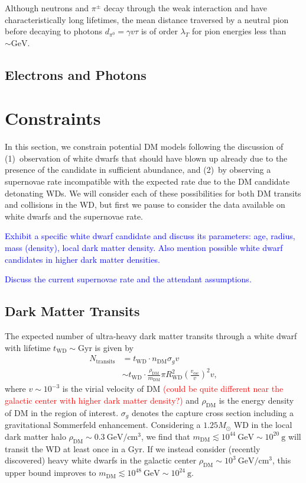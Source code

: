 \documentclass[twocolumn,showpacs,preprintnumbers,amsmath,amssymb,prd]{revtex4}
\newcommand{\GeV}{\text{GeV}}
\def\r{\right)}
\def\l{\left(}
\begin{document}
Although neutrons and $\pi^\pm$ decay through the weak interaction and have characteristically long lifetimes, the mean distance traversed by a neutral pion before decaying to photons $d_{\pi^0} = \gamma v \tau$ is of order $\lambda_T$ for pion energies less than $\sim \text{GeV}$. 
\subsection{Electrons and Photons}

\section{Constraints}
\label{sec:Constraints}

In this section, we constrain potential DM models following the discussion of \cite{Graham:2015apa} (1)~observation of white dwarfs that should have blown up already due to the presence of the candidate in sufficient abundance, and (2)~by observing a supernovae rate incompatible with the expected rate due to the DM candidate detonating WDs. We will consider each of these possibilities for both DM transits and collisions in the WD, but first we pause to consider the data available on white dwarfs and the supernovae rate.

\textcolor{blue}{Exhibit a specific white dwarf candidate and discuss its parameters: age, radius, mass (density), local dark matter density. Also mention possible white dwarf candidates in higher dark matter densities.}

\textcolor{blue}{Discuss the current supernovae rate and the attendant assumptions.}

\subsection{Dark Matter Transits}
\label{sec:TransitConstraints}

The expected number of ultra-heavy dark matter transits through a white dwarf with lifetime $t_\text{WD} \sim \text{Gyr}$ is given by
\begin{align}
N_\text{transits}  &= t_\text{WD} \cdot n_\text{DM} \sigma_g v \\
 &  \sim t_\text{WD} \cdot \frac{\rho_{\text{DM}}}{m_\text{DM}} \pi R_\text{WD}^2 \l\frac{v_\text{esc}}{v}\r^2 v,
\end{align}
where $v \sim 10^{-3}$ is the virial velocity of DM \textcolor{red}{(could be quite different near the galactic center with higher dark matter density?)} and $\rho_{\text{DM}}$ is the energy density of DM in the region of interest. $\sigma_g$ denotes the capture cross section including a gravitational Sommerfeld enhancement. Considering a $1.25 M_{\odot}$ WD in the local dark matter halo $\rho_{\text{DM}} \sim 0.3 ~\text{GeV}/\text{cm}^3$, we find that $m_\text{DM} \lesssim 10^{44} ~\GeV \sim 10^{20} ~\text{g}$ will transit the WD at least once in a Gyr. If we instead consider (recently discovered) heavy white dwarfs in the galactic center $\rho_{\text{DM}} \sim 10^3 ~\text{GeV}/\text{cm}^3$, this upper bound improves to $m_\text{DM} \lesssim 10^{48} ~\GeV \sim 10^{24} ~\text{g}$.
\end{document}
